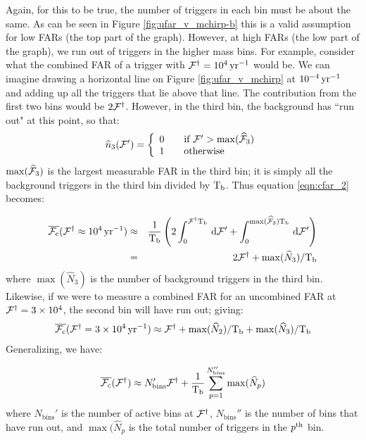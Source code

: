Again, for this to be true, the number of triggers in each bin must be about the same. As can be seen in Figure \ref{fig:ufar_v_mchirp-b} this is a valid assumption for low \acp{FAR} (the top part of the graph). However, at high \acp{FAR} (the low part of the graph), we run out of triggers in the higher mass bins. For example, consider what the combined \ac{FAR} of a trigger with $\mathcal{F}^\dagger = 10^4 \,\mathrm{yr}^{-1}$ would be. We can imagine drawing a horizontal line on Figure \ref{fig:ufar_v_mchirp} at $10^{-4} \,\mathrm{yr}^{-1}$ and adding up all the triggers that lie above that line. The contribution from the first two bins would be $2\mathcal{F}^\dagger$. However, in the third bin, the background has ``run out" at this point, so that:
\begin{equation}
\widehat{n}_3( \mathcal{F}' ) = \left\{ \begin{array}{l l}
    0 & \quad \mbox{if $\mathcal{F}' > \max(\widehat{\mathcal{F}}_3)$} \\
    1 & \quad \mbox{otherwise}\\ \end{array} \right.
\end{equation}
$\max(\widehat{\mathcal{F}}_3)$ is the largest measurable \ac{FAR} in the third bin; it is simply all the background triggers in the third bin divided by $\mathrm{T_b}$. Thus equation \ref{eqn:cfar_2} becomes:

\begin{eqnarray}
\label{eqn:cfar_4}
\overline{\cfar}(\far^\dagger \approx 10^{4}\yr^{-1}) & \approx & \frac{1}{\Tb} \left( 2 \int_{0}^{\far^\dagger \Tb} \d \far' + \int_{0}^{\max(\widehat{\far}_3) \Tb} \d \far' \right) \nonumber \\
 & = & 2 \far^\dagger + \max(\widehat{N}_3)/\Tb
\end{eqnarray}
where $\max(\widehat{N}_3)$ is the number of background triggers in the third bin. Likewise, if we were to measure a combined \ac{FAR} for an uncombined \ac{FAR} at $\mathcal{F}^\dagger = 3 \times 10^{4}$, the second bin will have run out; giving:
\begin{eqnarray}
\overline{\mathcal{F}_{\mathrm{c}}}(\mathcal{F}^\dagger = 3\times 10^{4}\,\mathrm{yr}^{-1}) \approx \mathcal{F}^\dagger + \max(\widehat{N}_2)/\mathrm{T_b} + \max(\widehat{N}_3)/\mathrm{T_b}
\end{eqnarray}
Generalizing, we have:

\begin{equation}
\label{eqn:cfar_alt}
\overline{\cfar}(\far^\dagger) \approx N_{\mathrm{bins}}' \far^\dagger + \frac{1}{\Tb} \sum_{p=1}^{N_{\mathrm{bins}}''} \max(\widehat{N}_p)
\end{equation}
where $N_{\mathrm{bins}}'$ is the number of active bins at $\mathcal{F}^\dagger$, $N_{\mathrm{bins}}''$ is the number of bins that have run out, and $\max(\widehat{N}_p$ is the total number of triggers in the $p^{\mathrm{th}}$ bin. 

